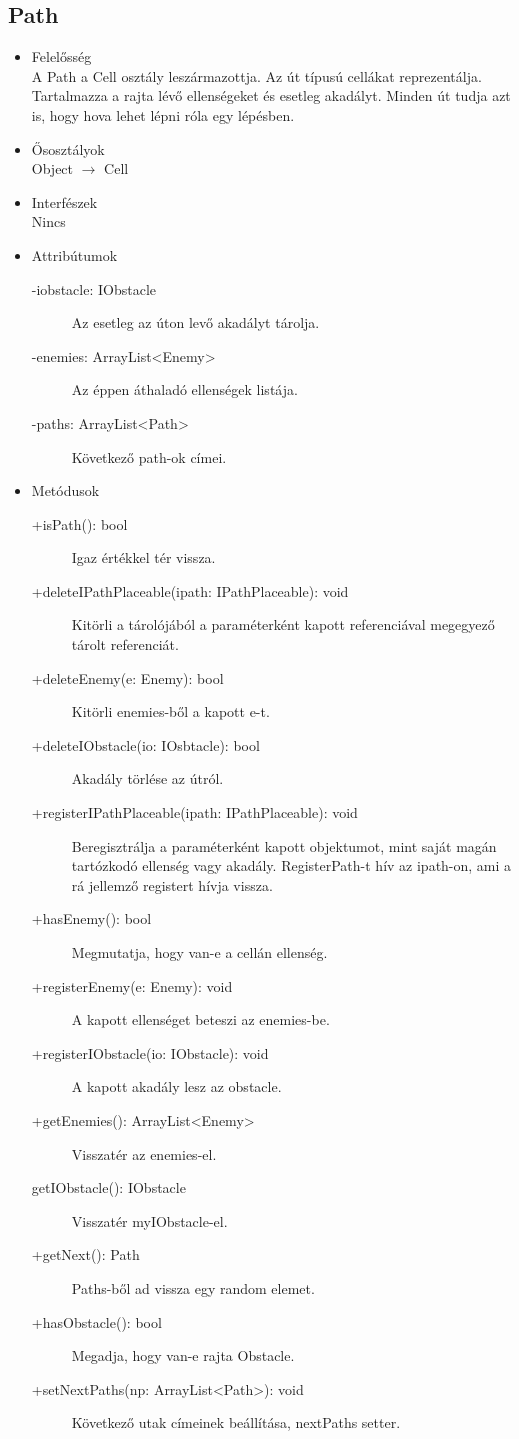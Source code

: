 \subsection{Path}
\begin{itemize}
\item Felelősség\\
A Path a Cell osztály leszármazottja. Az út típusú cellákat reprezentálja. Tartalmazza a rajta lévő ellenségeket és esetleg akadályt. Minden út tudja azt is, hogy hova lehet lépni róla egy lépésben.
\item Ősosztályok\\
Object $\rightarrow$ Cell
\item Interfészek\\
Nincs
\item Attribútumok\\
	\begin{description}
		\item[-iobstacle: IObstacle] Az esetleg az úton levő akadályt tárolja. 
		\item[-enemies: ArrayList<Enemy>] Az éppen áthaladó ellenségek listája. 
		\item[-paths: ArrayList<Path>] Következő path-ok címei. 

		
	\end{description}
\item Metódusok\\
	\begin{description} 
		\item[+isPath(): bool] Igaz értékkel tér vissza. 
		\item[+deleteIPathPlaceable(ipath: IPathPlaceable): void] Kitörli a tárolójából a paraméterként kapott referenciával megegyező tárolt referenciát. 
		\item[+deleteEnemy(e: Enemy): bool] Kitörli enemies-ből a kapott e-t. 
		\item[+deleteIObstacle(io: IOsbtacle): bool] Akadály törlése az útról. 
		\item[+registerIPathPlaceable(ipath: IPathPlaceable): void] Beregisztrálja a paraméterként kapott objektumot, mint saját magán tartózkodó ellenség vagy akadály. RegisterPath-t hív az ipath-on, ami a rá jellemző registert hívja vissza. 
		\item[+hasEnemy(): bool] Megmutatja, hogy van-e a cellán ellenség. 
		\item[+registerEnemy(e: Enemy): void] A kapott ellenséget beteszi az enemies-be. 
		\item[+registerIObstacle(io: IObstacle): void] A kapott akadály lesz az obstacle. 
		\item[+getEnemies(): ArrayList<Enemy>] Visszatér az enemies-el. 
		\item[getIObstacle(): IObstacle] Visszatér myIObstacle-el.
		\item[+getNext(): Path] Paths-ből ad vissza egy random elemet. 
		\item[+hasObstacle(): bool] Megadja, hogy van-e rajta Obstacle.
		\item[+setNextPaths(np: ArrayList<Path>): void] Következő utak címeinek beállítása, nextPaths setter.
		

\end{description}
\end{itemize}
